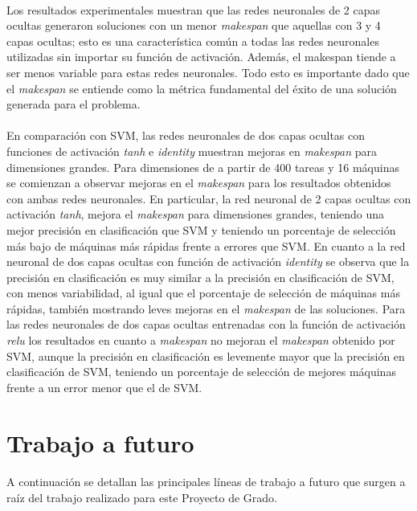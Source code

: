 \paragraph{}Los resultados experimentales muestran que las redes neuronales de 2 capas ocultas generaron soluciones con un menor \textit{makespan} que aquellas con 3 y 4 capas ocultas; esto es una característica común a todas las redes neuronales utilizadas sin importar su función de activación.
Además, el makespan tiende a ser menos variable para estas redes neuronales.
Todo esto es importante dado que el \textit{makespan} se entiende como la métrica fundamental del éxito de una solución generada para el problema.

\paragraph{}En comparación con SVM, las redes neuronales de dos capas ocultas con funciones de activación \textit{tanh} e \textit{identity} muestran mejoras en \textit{makespan} para dimensiones grandes.
Para dimensiones de a partir de 400 tareas y 16 máquinas se comienzan a observar mejoras en el \textit{makespan} para los resultados obtenidos con ambas redes neuronales.
En particular, la red neuronal de 2 capas ocultas con activación \textit{tanh}, mejora el \textit{makespan} para dimensiones grandes, teniendo una mejor precisión en clasificación que SVM y teniendo un porcentaje de selección más bajo de máquinas más rápidas frente a errores que SVM.
En cuanto a la red neuronal de dos capas ocultas con función de activación \textit{identity} se observa que la precisión en clasificación es muy similar a la precisión en clasificación de SVM, con menos variabilidad, al igual que el porcentaje de selección de máquinas más rápidas, también mostrando leves mejoras en el \textit{makespan} de las soluciones.
Para las redes neuronales de dos capas ocultas entrenadas con la función de activación \textit{relu} los resultados en cuanto a \textit{makespan} no mejoran el \textit{makespan} obtenido por SVM, aunque la precisión en clasificación es levemente mayor que la precisión en clasificación de SVM, teniendo un porcentaje de selección de mejores máquinas frente a un error menor que el de SVM. 

\section{Trabajo a futuro}

\paragraph{}A continuación se detallan las principales líneas de trabajo a futuro que surgen a raíz del trabajo realizado para este Proyecto de Grado.

